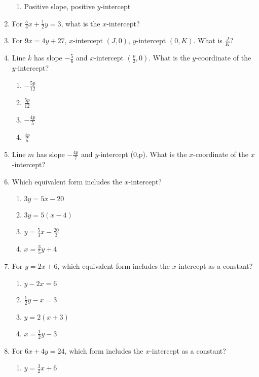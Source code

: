\documentclass[12pt]{exam}
\begin{document}
\begin{enumerate}
\begin{enumerate}[label=\Alph*)]
        \item Positive slope, positive $y$-intercept
    \end{enumerate}
    \item For $\frac{5}{4}x + \frac{1}{2}y = 3$, what is the $x$-intercept?
    \item For $9x = 4y + 27$, $x$-intercept $(J,0)$, $y$-intercept $(0,K)$. What is $\frac{J}{K}$?
    \item Line $k$ has slope $-\frac{5}{6}$ and $x$-intercept $(\frac{p}{2}, 0)$. What is the $y$-coordinate of the $y$-intercept?
    \begin{enumerate}[label=\Alph*)]
        \item $-\frac{5p}{12}$
        \item $\frac{5p}{12}$
        \item $-\frac{4p}{5}$
        \item $\frac{4p}{5}$
    \end{enumerate}
    \item Line $m$ has slope $-\frac{4p}{7}$ and $y$-intercept (0,p). What is the $x$-coordinate of the $x$-intercept?
    \item Which equivalent form includes the $x$-intercept?
    \begin{enumerate}[label=\Alph*)]
        \item $3y = 5x - 20$
        \item $3y = 5(x - 4)$
        \item $y = \frac{5}{3}x - \frac{20}{3}$
        \item $x = \frac{3}{5}y + 4$
    \end{enumerate}
    \item For $y = 2x + 6$, which equivalent form includes the $x$-intercept as a constant?
    \begin{enumerate}[label=\Alph*)]
        \item $y - 2x = 6$
        \item $\frac{1}{2}y - x = 3$
        \item $y = 2(x + 3)$
        \item $x = \frac{1}{2}y - 3$
    \end{enumerate}
    \item For $6x + 4y = 24$, which form includes the $x$-intercept as a constant?
    \begin{enumerate}[label=\Alph*)]
        \item $y = \frac{3}{2}x + 6$

\end{enumerate}
\end{enumerate}
\end{document}
